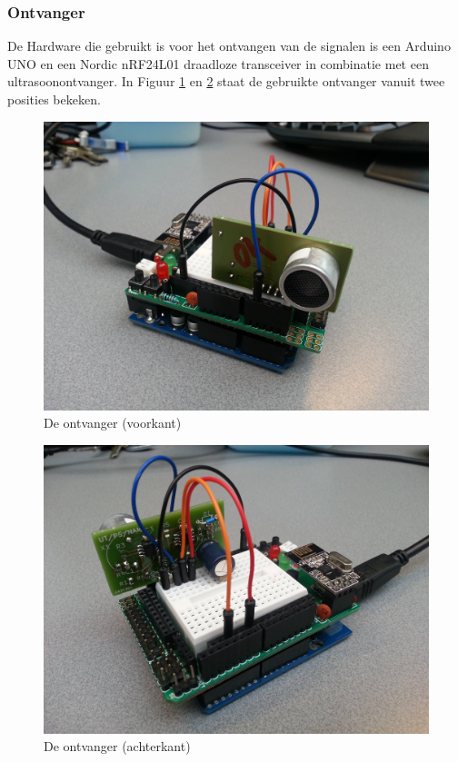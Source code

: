\documentclass{article}
\begin{document}
\subsubsection{Ontvanger}
De Hardware die gebruikt is voor het ontvangen van de signalen is een Arduino UNO en een Nordic nRF24L01 draadloze transceiver in combinatie met een ultrasoonontvanger. In Figuur \ref{voorkant} en \ref{achterkant} staat de gebruikte ontvanger vanuit twee posities bekeken.
\begin{figure}[h]
\centering\includegraphics[scale=0.06]{voorkant.jpg}
\caption{De ontvanger (voorkant)}
\label{voorkant}
\end{figure}
\begin{figure}[h]
\centering\includegraphics[scale=0.06]{achterkant.jpg}
\caption{De ontvanger (achterkant)}
\label{achterkant}
\end{figure}
\end{document}
